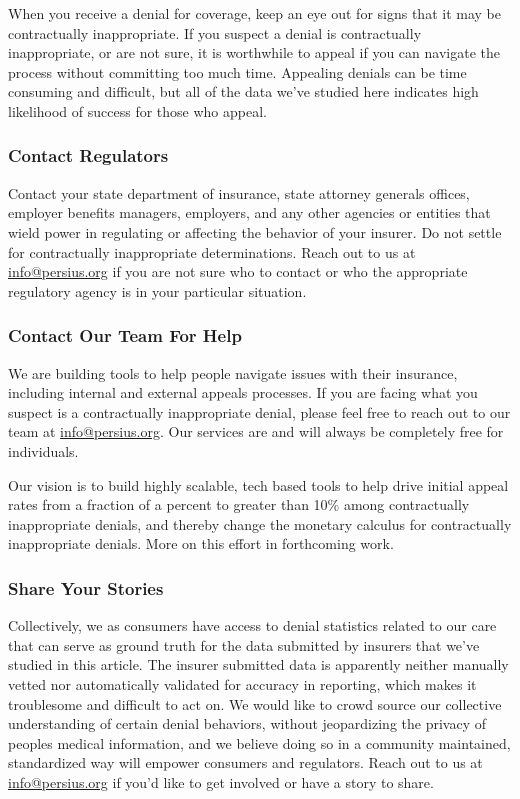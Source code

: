 \documentclass[12pt, a4paper,twoside,parskip=full]{report}
\theoremstyle{plain} %
\theoremstyle{definition} %
\theoremstyle{remark} %
\numberwithin{equation}{chapter}
\begin{document}
		When you receive a denial for coverage, keep an eye out for signs that it may be contractually inappropriate. If you suspect a denial is contractually inappropriate, or are not sure, it is worthwhile to appeal if you can navigate the process without committing too much time. Appealing denials can be time consuming and difficult, but all of the data we've studied here indicates high likelihood of success for those who appeal.
		
		\subsubsection{Contact Regulators}
		
		Contact your state department of insurance, state attorney generals offices, employer benefits managers, employers, and any other agencies or entities that wield power in regulating or affecting the behavior of your insurer. Do not settle for contractually inappropriate determinations. Reach out to us at \href{info@persius.org}{info@persius.org} if you are not sure who to contact or who the appropriate regulatory agency is in your particular situation.
		
		\subsubsection{Contact Our Team For Help}
		
		We are building tools to help people navigate issues with their insurance, including internal and external appeals processes. If you are facing what you suspect is a contractually inappropriate denial, please feel free to reach out to our team at \href{info@persius.org}{info@persius.org}. Our services are and will always be completely free for individuals.
		
		Our vision is to build highly scalable, tech based tools to help drive initial appeal rates from a fraction of a percent to greater than 10\% among contractually inappropriate denials, and thereby change the monetary calculus for contractually inappropriate denials. More on this effort in forthcoming work.
		
		
		\subsubsection{Share Your Stories}
		
		Collectively, we as consumers have access to denial statistics related to our care that can serve as ground truth for the data submitted by insurers that we've studied in this article. The insurer submitted data is apparently neither manually vetted nor automatically validated for accuracy in reporting, which makes it troublesome and difficult to act on. We would like to crowd source our collective understanding of certain denial behaviors, without jeopardizing the privacy of peoples medical information, and we believe doing so in a community maintained, standardized way will empower consumers and regulators. Reach out to us at \href{info@persius.org}{info@persius.org} if you'd like to get involved or have a story to share.

		
		
		
		
		
	
\end{document}
